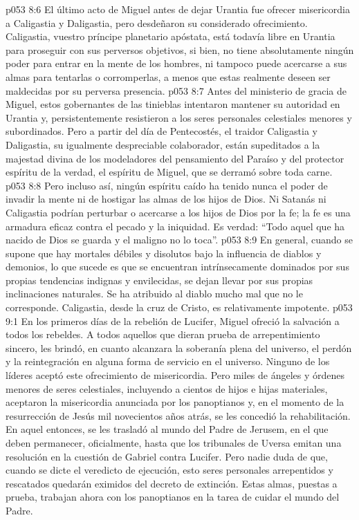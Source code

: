 \vs p053 8:6 \pc El último acto de Miguel antes de dejar Urantia fue ofrecer misericordia a Caligastia y Daligastia, pero desdeñaron su considerado ofrecimiento. Caligastia, vuestro príncipe planetario apóstata, está todavía libre en Urantia para proseguir con sus perversos objetivos, si bien, no tiene absolutamente ningún poder para entrar en la mente de los hombres, ni tampoco puede acercarse a sus almas para tentarlas o corromperlas, a menos que estas realmente deseen ser maldecidas por su perversa presencia.
\vs p053 8:7 \pc Antes del ministerio de gracia de Miguel, estos gobernantes de las tinieblas intentaron mantener su autoridad en Urantia y, persistentemente resistieron a los seres personales celestiales menores y subordinados. Pero a partir del día de Pentecostés, el traidor Caligastia y Daligastia, su igualmente despreciable colaborador, están supeditados a la majestad divina de los modeladores del pensamiento del Paraíso y del protector espíritu de la verdad, el espíritu de Miguel, que se derramó sobre toda carne.
\vs p053 8:8 Pero incluso así, ningún espíritu caído ha tenido nunca el poder de invadir la mente ni de hostigar las almas de los hijos de Dios. Ni Satanás ni Caligastia podrían perturbar o acercarse a los hijos de Dios por la fe; la fe es una armadura eficaz contra el pecado y la iniquidad. Es verdad: “Todo aquel que ha nacido de Dios se guarda y el maligno no lo toca”.
\vs p053 8:9 En general, cuando se supone que hay mortales débiles y disolutos bajo la influencia de diablos y demonios, lo que sucede es que se encuentran intrínsecamente dominados por sus propias tendencias indignas y envilecidas, se dejan llevar por sus propias inclinaciones naturales. Se ha atribuido al diablo mucho mal que no le corresponde. Caligastia, desde la cruz de Cristo, es relativamente impotente.
\vs p053 9:1 En los primeros días de la rebelión de Lucifer, Miguel ofreció la salvación a todos los rebeldes. A todos aquellos que dieran prueba de arrepentimiento sincero, les brindó, en cuanto alcanzara la soberanía plena del universo, el perdón y la reintegración en alguna forma de servicio en el universo. Ninguno de los líderes aceptó este ofrecimiento de misericordia. Pero miles de ángeles y órdenes menores de seres celestiales, incluyendo a cientos de hijos e hijas materiales, aceptaron la misericordia anunciada por los panoptianos y, en el momento de la resurrección de Jesús mil novecientos años atrás, se les concedió la rehabilitación. En aquel entonces, se les trasladó al mundo del Padre de Jerusem, en el que deben permanecer, oficialmente, hasta que los tribunales de Uversa emitan una resolución en la cuestión de Gabriel contra Lucifer. Pero nadie duda de que, cuando se dicte el veredicto de ejecución, esto seres personales arrepentidos y rescatados quedarán eximidos del decreto de extinción. Estas almas, puestas a prueba, trabajan ahora con los panoptianos en la tarea de cuidar el mundo del Padre.
